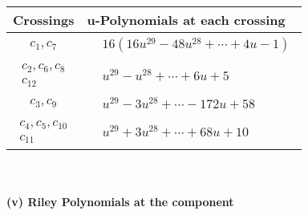 \documentclass[1p]{elsarticle_modified}
\theoremstyle{definition}
\begin{document}
\begin{tabular}{m{50pt}|m{274pt}}
Crossings & \hspace{64pt}u-Polynomials at each crossing \\
\hline $$\begin{aligned}c_{1},c_{7}\end{aligned}$$&$\begin{aligned}
&16(16 u^{29}-48 u^{28}+\cdots+4 u-1)
\end{aligned}$\\
\hline $$\begin{aligned}c_{2},c_{6},c_{8}\\c_{12}\end{aligned}$$&$\begin{aligned}
&u^{29}- u^{28}+\cdots+6 u+5
\end{aligned}$\\
\hline $$\begin{aligned}c_{3},c_{9}\end{aligned}$$&$\begin{aligned}
&u^{29}-3 u^{28}+\cdots-172 u+58
\end{aligned}$\\
\hline $$\begin{aligned}c_{4},c_{5},c_{10}\\c_{11}\end{aligned}$$&$\begin{aligned}
&u^{29}+3 u^{28}+\cdots+68 u+10
\end{aligned}$\\
\hline
\end{tabular}\\~\\
\newpage\renewcommand{\arraystretch}{1}
\flushleft \textbf{(v) Riley Polynomials at the component}\newline \\
\end{document}
